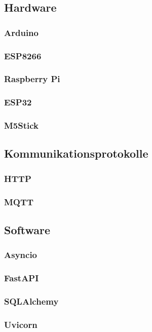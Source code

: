 \documentclass[12pt, letterpaper]{article}
\begin{document}
  \subsection{Hardware}
    \subsubsection{Arduino}
    \subsubsection{ESP8266}
    \subsubsection{Raspberry Pi}
    \subsubsection{ESP32}
    \subsubsection{M5Stick}
    

  \subsection{Kommunikationsprotokolle}
  \subsubsection{HTTP}
  \subsubsection{MQTT}
    
  \subsection{Software}
    \subsubsection{Asyncio}
    \subsubsection{FastAPI}
    \subsubsection{SQLAlchemy}
    \subsubsection{Uvicorn}
\end{document}
